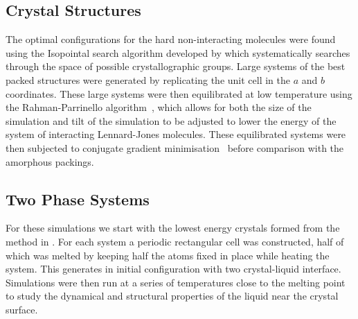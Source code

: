\subsection{Crystal Structures}
\label{sec:method crys struc}

The optimal configurations for the hard non-interacting molecules were found using the Isopointal search algorithm developed by \textcite{hudson:10} which systematically searches through the space of possible crystallographic groups. Large systems of the best packed structures were generated by replicating the unit cell in the $a$ and $b$ coordinates. These large systems were then equilibrated at low temperature using the Rahman-Parrinello algorithm~\cite{parrinello:80}, which allows for both the size of the simulation and tilt of the simulation to be adjusted to lower the energy of the system of interacting Lennard-Jones molecules. These equilibrated systems were then subjected to conjugate gradient minimisation~\cite{hestenes:52} before comparison with the amorphous packings.

\subsection{Two Phase Systems}

For these simulations we start with the lowest energy crystals formed from the method in . For each system a periodic rectangular cell was constructed, half of which was melted by keeping half the atoms fixed in place while heating the system. This generates in initial configuration with two crystal-liquid interface. Simulations were then run at a series of temperatures close to the melting point to study the dynamical and structural properties of the liquid near the crystal surface.
